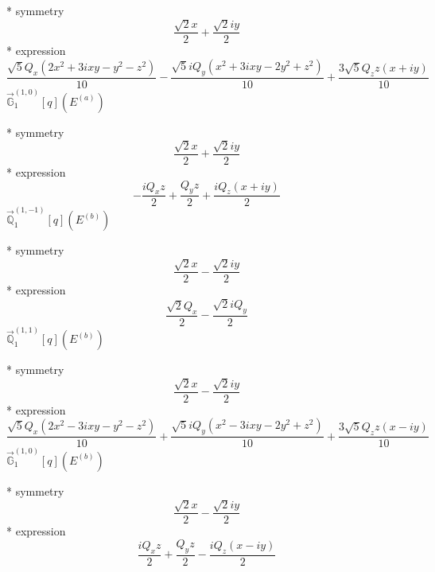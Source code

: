 \documentclass[fleqn,8pt]{jsarticle}
\begin{document}
\noindent\quad ** symmetry
\begin{dmath*}
\frac{\sqrt{2} x}{2} + \frac{\sqrt{2} i y}{2}
\end{dmath*}
\noindent\quad ** expression
\begin{dmath*}
\frac{\sqrt{5} Q_{x} \left(2 x^{2} + 3 i x y - y^{2} - z^{2}\right)}{10} - \frac{\sqrt{5} i Q_{y} \left(x^{2} + 3 i x y - 2 y^{2} + z^{2}\right)}{10} + \frac{3 \sqrt{5} Q_{z} z \left(x + i y\right)}{10}
\end{dmath*}
\noindent\quad $\vec{\mathbb{G}}_{1}^{(1,0)}[q](E^{(a)})$

\noindent\quad ** symmetry
\begin{dmath*}
\frac{\sqrt{2} x}{2} + \frac{\sqrt{2} i y}{2}
\end{dmath*}
\noindent\quad ** expression
\begin{dmath*}
- \frac{i Q_{x} z}{2} + \frac{Q_{y} z}{2} + \frac{i Q_{z} \left(x + i y\right)}{2}
\end{dmath*}
\noindent\quad $\vec{\mathbb{Q}}_{1}^{(1,-1)}[q](E^{(b)})$

\noindent\quad ** symmetry
\begin{dmath*}
\frac{\sqrt{2} x}{2} - \frac{\sqrt{2} i y}{2}
\end{dmath*}
\noindent\quad ** expression
\begin{dmath*}
\frac{\sqrt{2} Q_{x}}{2} - \frac{\sqrt{2} i Q_{y}}{2}
\end{dmath*}
\noindent\quad $\vec{\mathbb{Q}}_{1}^{(1,1)}[q](E^{(b)})$

\noindent\quad ** symmetry
\begin{dmath*}
\frac{\sqrt{2} x}{2} - \frac{\sqrt{2} i y}{2}
\end{dmath*}
\noindent\quad ** expression
\begin{dmath*}
\frac{\sqrt{5} Q_{x} \left(2 x^{2} - 3 i x y - y^{2} - z^{2}\right)}{10} + \frac{\sqrt{5} i Q_{y} \left(x^{2} - 3 i x y - 2 y^{2} + z^{2}\right)}{10} + \frac{3 \sqrt{5} Q_{z} z \left(x - i y\right)}{10}
\end{dmath*}
\noindent\quad $\vec{\mathbb{G}}_{1}^{(1,0)}[q](E^{(b)})$

\noindent\quad ** symmetry
\begin{dmath*}
\frac{\sqrt{2} x}{2} - \frac{\sqrt{2} i y}{2}
\end{dmath*}
\noindent\quad ** expression
\begin{dmath*}
\frac{i Q_{x} z}{2} + \frac{Q_{y} z}{2} - \frac{i Q_{z} \left(x - i y\right)}{2}
\end{dmath*}
\end{document}
